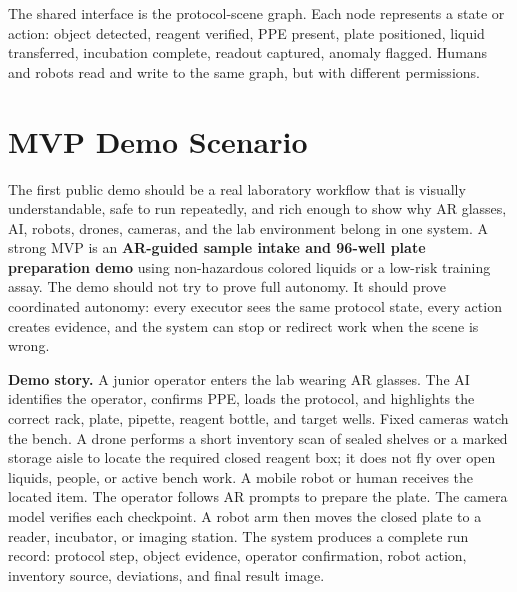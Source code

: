 \documentclass[11pt]{article}
\begin{document}
The shared interface is the protocol-scene graph. Each node represents a state or action: object detected, reagent verified, PPE present, plate positioned, liquid transferred, incubation complete, readout captured, anomaly flagged. Humans and robots read and write to the same graph, but with different permissions.

\section{MVP Demo Scenario}

The first public demo should be a real laboratory workflow that is visually understandable, safe to run repeatedly, and rich enough to show why AR glasses, AI, robots, drones, cameras, and the lab environment belong in one system. A strong MVP is an \textbf{AR-guided sample intake and 96-well plate preparation demo} using non-hazardous colored liquids or a low-risk training assay. The demo should not try to prove full autonomy. It should prove coordinated autonomy: every executor sees the same protocol state, every action creates evidence, and the system can stop or redirect work when the scene is wrong.

\textbf{Demo story.} A junior operator enters the lab wearing AR glasses. The AI identifies the operator, confirms PPE, loads the protocol, and highlights the correct rack, plate, pipette, reagent bottle, and target wells. Fixed cameras watch the bench. A drone performs a short inventory scan of sealed shelves or a marked storage aisle to locate the required closed reagent box; it does not fly over open liquids, people, or active bench work. A mobile robot or human receives the located item. The operator follows AR prompts to prepare the plate. The camera model verifies each checkpoint. A robot arm then moves the closed plate to a reader, incubator, or imaging station. The system produces a complete run record: protocol step, object evidence, operator confirmation, robot action, inventory source, deviations, and final result image.
\end{document}
